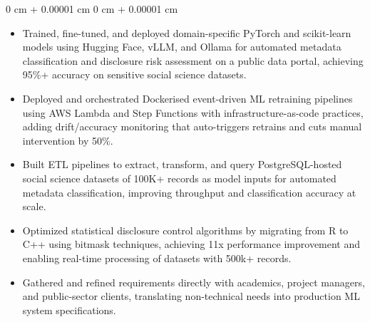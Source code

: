 \documentclass[6pt, letterpaper]{article}
\newenvironment{highlights}{
    \begin{itemize}[
        topsep=0.03 cm,
        parsep=0.03 cm,
        partopsep=0pt,
        itemsep=0pt,
        leftmargin=0 cm + 10pt
    ]
}{
    \end{itemize}
} %
\newenvironment{onecolentry}{
    \begin{adjustwidth}{
        0 cm + 0.00001 cm
    }{
        0 cm + 0.00001 cm
    }
}{
    \end{adjustwidth}
} %
\begin{document}
        \begin{onecolentry}
        \begin{highlights}

            \item Trained, fine-tuned, and deployed domain-specific PyTorch and scikit-learn models using Hugging Face, vLLM, and Ollama for automated metadata classification and disclosure risk assessment on a public data portal, achieving 95\%+ accuracy on sensitive social science datasets.
            \item Deployed and orchestrated Dockerised event-driven ML retraining pipelines using AWS Lambda and Step Functions with infrastructure-as-code practices, adding drift/accuracy monitoring that auto-triggers retrains and cuts manual intervention by 50\%.
            \item Built ETL pipelines to extract, transform, and query PostgreSQL-hosted social science datasets of 100K+ records as model inputs for automated metadata classification, improving throughput and classification accuracy at scale.
            \item Optimized statistical disclosure control algorithms by migrating from R to C++ using bitmask techniques, achieving 11x performance improvement and enabling real-time processing of datasets with 500k+ records.
            \item Gathered and refined requirements directly with academics, project managers, and public-sector clients, translating non-technical needs into production ML system specifications.

        \end{highlights}
        \end{onecolentry}
\end{document}
